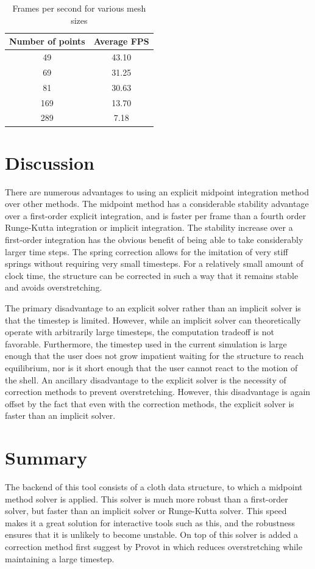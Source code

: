 \documentclass{thesis}
\begin{document}
\begin{table}
\begin{center}
  \begin{tabular}{ | c | c | }
    \hline
    Number of points & Average FPS \\ \hline
	49 & 43.10 \\ \hline
	69 & 31.25 \\ \hline
    81 & 30.63 \\ \hline
	169 & 13.70 \\ \hline
    289 & 7.18 \\ \hline
  \end{tabular}
  \caption{Frames per second for various mesh sizes}
\end{center}
\end{table}

\section{Discussion}
There are numerous advantages to using an explicit midpoint integration method over other methods.  The midpoint method has a
considerable stability advantage over a first-order explicit integration, and is faster per frame than a fourth order Runge-Kutta
integration or implicit integration.  The stability increase over a first-order integration has the obvious benefit of being able to
take considerably larger time steps.  The spring correction allows for the imitation of very stiff springs without requiring very
small timesteps.  For a relatively small amount of clock time, the structure can be corrected in such a way that it remains stable
and avoids overstretching.

The primary disadvantage to an explicit solver rather than an implicit solver is that the timestep is limited.  However, while an
implicit solver can theoretically operate with arbitrarily large timesteps, the computation tradeoff is not favorable.  Furthermore,
the timestep used in the current simulation is large enough that the user does not grow impatient waiting for the structure to reach
equilibrium, nor is it short enough that the user cannot react to the motion of the shell.  An ancillary disadvantage to the
explicit solver is the necessity of correction methods to prevent overstretching.  However, this disadvantage is again offset by the
fact that even with the correction methods, the explicit solver is faster than an implicit solver.

\section{Summary}
The backend of this tool consists of a cloth data structure, to which a midpoint method solver is applied.  This solver is much more
robust than a first-order solver, but faster than an implicit solver or Runge-Kutta solver.  This speed makes it a great solution
for interactive tools such as this, and the robustness ensures that it is unlikely to become unstable.  On top of this solver is
added a correction method first suggest by Provot in \cite{provot95deformationconstraints} which reduces overstretching while
maintaining a large timestep.
\end{document}
